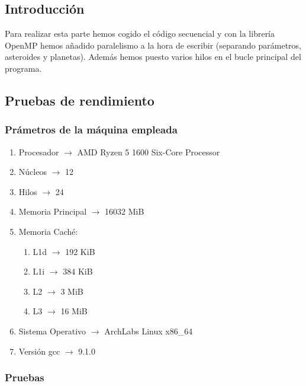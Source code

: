 \documentclass[12pt]{article}
\begin{document}
        \subsection{Introducción}
        \noindent Para realizar esta parte hemos cogido el código secuencial y con la librería OpenMP hemos añadido paralelismo a la hora de escribir (separando parámetros, asteroides y planetas). Además hemos puesto varios hilos en el bucle principal del programa.
        \subsection{Pruebas de rendimiento}
        \subsubsection{Prámetros de la máquina empleada}
            \begin{enumerate}
                \item Procesador $\rightarrow$ AMD Ryzen 5 1600 Six-Core Processor
                \item Núcleos $\rightarrow$ 12
                \item Hilos $\rightarrow$ 24
                \item Memoria Principal $\rightarrow$ 16032 MiB
                \item Memoria Caché:
                    \begin{enumerate}
                        \item L1d $\rightarrow$ 192 KiB
                        \item L1i $\rightarrow$ 384 KiB
                        \item L2 $\rightarrow$ 3 MiB
                        \item L3 $\rightarrow$ 16 MiB
                    \end{enumerate}
                \item Sistema Operativo $\rightarrow$ ArchLabs Linux x86\_64
                \item Versión gcc $\rightarrow$ 9.1.0
            \end{enumerate}
        \subsubsection{Pruebas}
        
        
\end{document}
